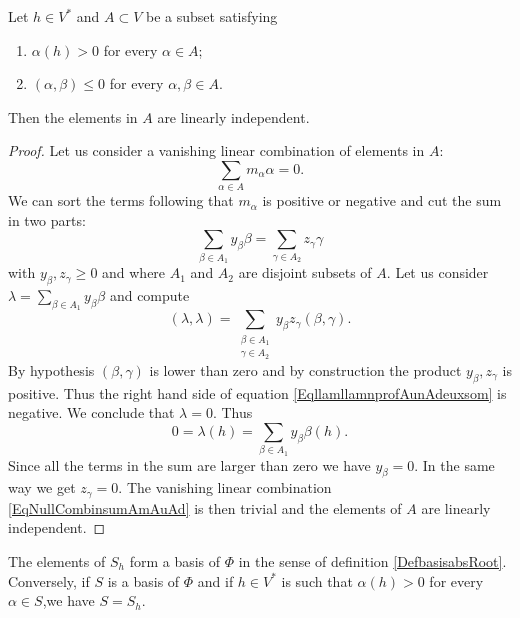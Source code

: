 \begin{lemma}        \label{LemIndepAhVstar}
    Let \( h\in V^*\) and \( A\subset V\) be a subset satisfying
    \begin{enumerate}
        \item
            \( \alpha(h)>0\) for every \( \alpha\in A\);
        \item
            \( (\alpha,\beta)\leq 0\) for every \( \alpha,\beta\in A\).
    \end{enumerate}
    Then the elements in \( A\) are linearly independent.
\end{lemma}

\begin{proof}
    Let us consider a vanishing linear combination of elements in \( A\):
    \begin{equation}        \label{EqNullCombinsumAmAuAd}
        \sum_{\alpha\in A}m_{\alpha}\alpha=0.
    \end{equation}
    We can sort the terms following that \( m_{\alpha}\) is positive or negative and cut the sum in two parts:
    \begin{equation}
        \sum_{\beta\in A_1}y_{\beta}\beta=\sum_{\gamma\in A_2}z_{\gamma}\gamma
    \end{equation}
    with \( y_{\beta},z_{\gamma}\geq 0\) and where \( A_1\) and \( A_2\) are disjoint subsets of \( A\). Let us consider \( \lambda=\sum_{\beta\in A_1}y_{\beta}\beta\) and compute
    \begin{equation}        \label{EqllamllamnprofAunAdeuxsom}
        (\lambda,\lambda)=\sum_{\substack{\beta\in A_1\\\gamma\in A_2}}y_{\beta}z_{\gamma}(\beta,\gamma).
    \end{equation}
    By hypothesis \( (\beta,\gamma)\) is lower than zero and by construction the product \( y_{\beta},z_{\gamma}\) is positive. Thus the right hand side of equation \eqref{EqllamllamnprofAunAdeuxsom} is negative. We conclude that \( \lambda=0\). Thus
    \begin{equation}
        0=\lambda(h)=\sum_{\beta\in A_1}y_{\beta}\beta(h).
    \end{equation}
    Since all the terms in the sum are larger than zero we have \( y_{\beta}=0\). In the same way we get \( z_{\gamma}=0\). The vanishing linear combination \eqref{EqNullCombinsumAmAuAd} is then trivial and the elements of \( A\) are linearly independent.
\end{proof}

\begin{proposition}\label{PropSestShsi}
    The elements of \( S_h\) form a basis of \( \Phi\) in the sense of definition \ref{DefbasisabsRoot}. Conversely, if \( S\) is a basis of \( \Phi\) and if \( h\in V^*\) is such that \( \alpha(h)>0\) for every \( \alpha\in S\),we have \( S=S_h\).
\end{proposition}


